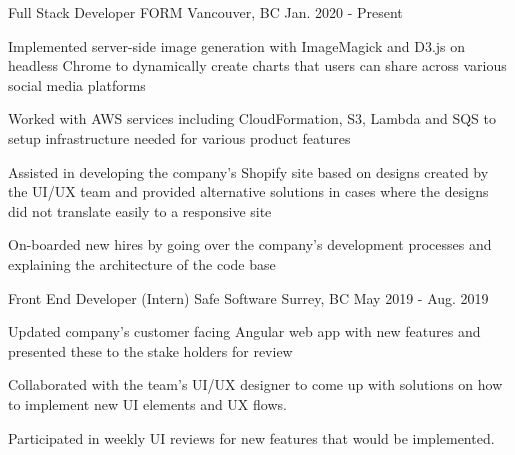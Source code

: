 

\begin{cventries}

  \cventry
    {Full Stack Developer} %
    {FORM} %
    {Vancouver, BC} %
    {Jan. 2020 - Present} %
    {
      \begin{cvitems} %
        \item {Implemented server-side image generation with ImageMagick and D3.js on headless Chrome to dynamically create charts that users can share across various social media platforms}
        \item {Worked with AWS services including CloudFormation, S3, Lambda and SQS to setup infrastructure needed for various product features}
        \item {Assisted in developing the company's Shopify site based on designs created by the UI/UX team and provided alternative solutions in cases where the designs did not translate easily to a responsive site}
        \item {On-boarded new hires by going over the company's development processes and explaining the architecture of the code base}
      \end{cvitems}
    }

  \cventry
    {Front End Developer (Intern)} %
    {Safe Software} %
    {Surrey, BC} %
    {May 2019 - Aug. 2019} %
    {
      \begin{cvitems} %
        \item {Updated company's customer facing Angular web app with new features and presented these to the stake holders for review}
        \item {Collaborated with the team's UI/UX designer to come up with solutions on how to implement new UI elements and UX flows.}
        \item {Participated in weekly UI reviews for new features that would be implemented.}
      \end{cvitems}
    }


\end{cventries}
